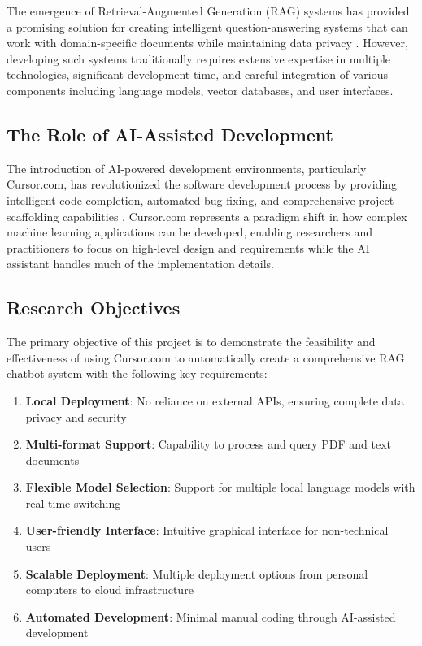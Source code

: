 The emergence of Retrieval-Augmented Generation (RAG) systems has provided a promising solution for creating intelligent question-answering systems that can work with domain-specific documents while maintaining data privacy \citep{lewis2020retrieval}. However, developing such systems traditionally requires extensive expertise in multiple technologies, significant development time, and careful integration of various components including language models, vector databases, and user interfaces.

\subsection{The Role of AI-Assisted Development}

The introduction of AI-powered development environments, particularly Cursor.com, has revolutionized the software development process by providing intelligent code completion, automated bug fixing, and comprehensive project scaffolding capabilities \citep{cursor2024}. Cursor.com represents a paradigm shift in how complex machine learning applications can be developed, enabling researchers and practitioners to focus on high-level design and requirements while the AI assistant handles much of the implementation details.

\subsection{Research Objectives}

The primary objective of this project is to demonstrate the feasibility and effectiveness of using Cursor.com to automatically create a comprehensive RAG chatbot system with the following key requirements:

\begin{enumerate}
    \item \textbf{Local Deployment}: No reliance on external APIs, ensuring complete data privacy and security
    \item \textbf{Multi-format Support}: Capability to process and query PDF and text documents
    \item \textbf{Flexible Model Selection}: Support for multiple local language models with real-time switching
    \item \textbf{User-friendly Interface}: Intuitive graphical interface for non-technical users
    \item \textbf{Scalable Deployment}: Multiple deployment options from personal computers to cloud infrastructure
    \item \textbf{Automated Development}: Minimal manual coding through AI-assisted development
\end{enumerate}

